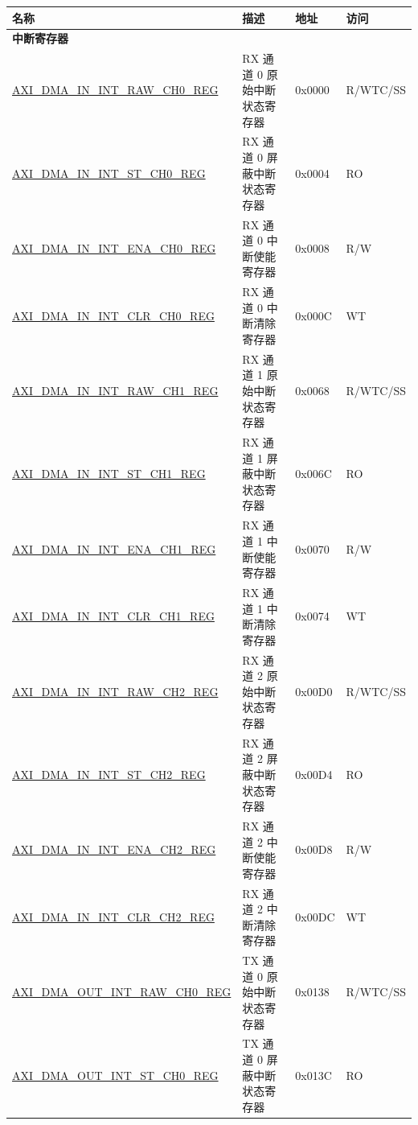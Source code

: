 \begin{longtable}{ | l | l | p{1.3cm} | l | }
\hline\rowcolor{lightgray}
\textbf{名称} & \textbf{描述} & \textbf{地址} & \textbf{访问} \\ \hline
\endhead
\multicolumn{4}{|l|}{\textbf{中断寄存器}} \\ \hline
\hyperref[regdesc:AXIDMAININTRAWCHNREG]{AXI\_DMA\_IN\_INT\_RAW\_CH0\_REG} & RX 通道 0 原始中断状态寄存器 & 0x0000 & R/WTC/SS \\ \hline
\hyperref[regdesc:AXIDMAININTSTCHNREG]{AXI\_DMA\_IN\_INT\_ST\_CH0\_REG} & RX 通道 0 屏蔽中断状态寄存器 & 0x0004 & RO \\ \hline
\hyperref[regdesc:AXIDMAININTENACHNREG]{AXI\_DMA\_IN\_INT\_ENA\_CH0\_REG} & RX 通道 0 中断使能寄存器 & 0x0008 & R/W \\ \hline
\hyperref[regdesc:AXIDMAININTCLRCHNREG]{AXI\_DMA\_IN\_INT\_CLR\_CH0\_REG} & RX 通道 0 中断清除寄存器 & 0x000C & WT \\ \hline
\hyperref[regdesc:AXIDMAININTRAWCHNREG]{AXI\_DMA\_IN\_INT\_RAW\_CH1\_REG} & RX 通道 1 原始中断状态寄存器 & 0x0068 & R/WTC/SS \\ \hline
\hyperref[regdesc:AXIDMAININTSTCHNREG]{AXI\_DMA\_IN\_INT\_ST\_CH1\_REG} & RX 通道 1 屏蔽中断状态寄存器 & 0x006C & RO \\ \hline
\hyperref[regdesc:AXIDMAININTENACHNREG]{AXI\_DMA\_IN\_INT\_ENA\_CH1\_REG} & RX 通道 1 中断使能寄存器 & 0x0070 & R/W \\ \hline
\hyperref[regdesc:AXIDMAININTCLRCHNREG]{AXI\_DMA\_IN\_INT\_CLR\_CH1\_REG} & RX 通道 1 中断清除寄存器 & 0x0074 & WT \\ \hline
\hyperref[regdesc:AXIDMAININTRAWCHNREG]{AXI\_DMA\_IN\_INT\_RAW\_CH2\_REG} & RX 通道 2 原始中断状态寄存器 & 0x00D0 & R/WTC/SS \\ \hline
\hyperref[regdesc:AXIDMAININTSTCHNREG]{AXI\_DMA\_IN\_INT\_ST\_CH2\_REG} & RX 通道 2 屏蔽中断状态寄存器 & 0x00D4 & RO \\ \hline
\hyperref[regdesc:AXIDMAININTENACHNREG]{AXI\_DMA\_IN\_INT\_ENA\_CH2\_REG} & RX 通道 2 中断使能寄存器 & 0x00D8 & R/W \\ \hline
\hyperref[regdesc:AXIDMAININTCLRCHNREG]{AXI\_DMA\_IN\_INT\_CLR\_CH2\_REG} & RX 通道 2 中断清除寄存器 & 0x00DC & WT \\ \hline
\hyperref[regdesc:AXIDMAOUTINTRAWCHNREG]{AXI\_DMA\_OUT\_INT\_RAW\_CH0\_REG} & TX 通道 0 原始中断状态寄存器 & 0x0138 & R/WTC/SS \\ \hline
\hyperref[regdesc:AXIDMAOUTINTSTCHNREG]{AXI\_DMA\_OUT\_INT\_ST\_CH0\_REG} & TX 通道 0 屏蔽中断状态寄存器 & 0x013C & RO \\ \hline

\end{longtable}

